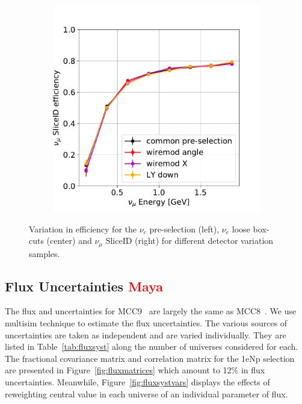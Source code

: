 \documentclass[a4paper]{article}
\begin{document}
\begin{figure}[H]
\begin{center}
\begin{subfigure}[b]{0.3\textwidth}
    \end{subfigure}
    \begin{subfigure}[b]{0.3\textwidth}
    \centering
    \includegraphics[width=1.00\textwidth]{detsys/nu_e01162020_numu_slice_eff.pdf}
    \end{subfigure}
\caption{\label{fig:detsys:dedx:eLEElow}Variation in efficiency for the $\nu_e$ pre-selection (left), $\nu_e$ loose box-cuts (center) and $\nu_{\mu}$ SliceID (right) for different detector variation samples.}
\end{center}
\end{figure}

\subsection{Flux Uncertainties \textcolor{red}{Maya}}
The flux and uncertainties for MCC9~\cite{bib:fluxmcc9} are largely the same as MCC8~\cite{bib:fluxtechnote}. We use multisim technique to estimate the flux uncertainties. The various sources of uncertainties are taken as independent and are varied individually. They are listed in Table~\ref{tab:fluxsyst} along the number of universes considered for each. The fractional covariance matrix and correlation matrix for the 1eNp selection are presented in Figure~\ref{fig:fluxmatrices} which amount to 12\% in flux uncertainties. Meanwhile, Figure~\ref{fig:fluxsystvars} displays the effects of reweighting central value in each universe of an individual parameter of flux.
\end{document}
